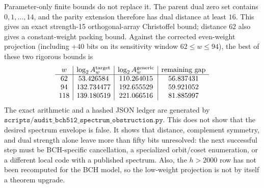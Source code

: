 Parameter-only finite bounds do not replace it.  The parent dual zero set contains \(0,1,\ldots,14\), and the parity
extension therefore has dual distance at least \(16\).  This gives an exact strength-15 orthogonal-array Christoffel
bound; distance \(62\) also gives a constant-weight packing bound.  Against the corrected even-weight projection
(including \(+40\) bits on its sensitivity window \(62\le w\le94\)), the best of these two rigorous bounds is
\[
\begin{array}{c|c|c|c}
w & \log_2 A_w^{\rm target} & \log_2 A_w^{\rm generic} & \text{remaining gap}\\
\hline
62  & 53.426584  & 110.264015 & 56.837431\\
94  & 132.734477 & 192.655529 & 59.921052\\
118 & 139.180519 & 221.066516 & 81.885997
\end{array}
\]
The exact arithmetic and a hashed JSON ledger are generated by
\(\texttt{scripts/audit\_bch512\_spectrum\_obstruction.py}\).  This does not show that the desired spectrum envelope
is false.  It shows that distance, complement symmetry, and dual strength alone leave more than fifty bits unresolved:
the next successful step must be BCH-specific cancellation, a specialized orbit/coset enumeration, or a different
local code with a published spectrum.  Also, the \(h>2000\) row has not been recomputed for the BCH model, so the
low-weight projection is not by itself a theorem upgrade.
